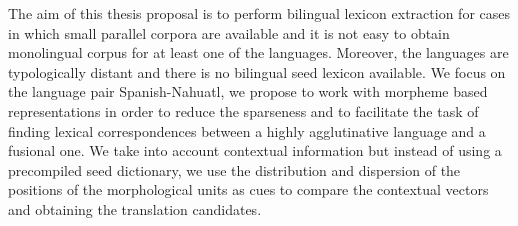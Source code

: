 The aim of this thesis proposal is to perform bilingual lexicon extraction for cases in which small parallel corpora are available and it is not easy to obtain monolingual corpus for at least one of the languages. Moreover, the languages are typologically distant and there is no bilingual seed lexicon available. We focus on the language pair Spanish-Nahuatl, we propose to work with morpheme based representations in order to reduce the sparseness and to facilitate the task of finding lexical correspondences between a highly agglutinative language and a fusional one. We take into account contextual information but instead of using a precompiled seed dictionary, we use the distribution and dispersion of the positions of the morphological units as cues to compare the contextual vectors and obtaining the translation candidates.
